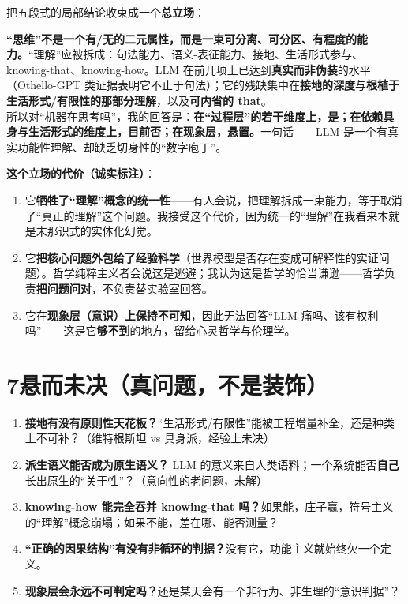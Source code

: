 \documentclass[12pt,a4paper,fontset=none]{ctexart}
\newcommand{\saying}[1]{{\notomed\color{accent}#1}}
\begin{document}
把五段式的局部结论收束成一个\textbf{总立场}：

\begin{mainline}
\textbf{“思维”不是一个有/无的二元属性，而是一束可分离、可分区、有程度的能力。}“理解”应被拆成：句法能力、语义-表征能力、接地、生活形式参与、knowing-that、knowing-how。LLM 在前几项上已达到\textbf{真实而非伪装}的水平（Othello-GPT 类证据表明它不止于句法）；它的残缺集中在\textbf{接地的深度}与\textbf{根植于生活形式/有限性的那部分理解}，以及\textbf{可内省的 that}。\\[0.5em]
所以对“机器在思考吗”，我的回答是：\textbf{在“过程层”的若干维度上，是；在依赖具身与生活形式的维度上，目前否；在现象层，悬置。}一句话——\saying{LLM 是一个有真实功能性理解、却缺乏切身性的“数字庖丁”。}
\end{mainline}

\noindent\textbf{这个立场的代价（诚实标注）}：
\begin{enumerate}[leftmargin=2.2em,itemsep=0.25em]
\item 它\textbf{牺牲了“理解”概念的统一性}——有人会说，把理解拆成一束能力，等于取消了“真正的理解”这个问题。我接受这个代价，因为统一的“理解”在我看来本就是末那识式的实体化幻觉。
\item 它\textbf{把核心问题外包给了经验科学}（世界模型是否存在变成可解释性的实证问题）。哲学纯粹主义者会说这是逃避；我认为这是哲学的恰当谦逊——哲学负责\textbf{把问题问对}，不负责替实验室回答。
\item 它在\textbf{现象层（意识）上保持不可知}，因此无法回答“LLM 痛吗、该有权利吗”——这是它\textbf{够不到}的地方，留给心灵哲学与伦理学。
\end{enumerate}

\section*{7\quad 悬而未决（真问题，不是装饰）}

\begin{enumerate}[leftmargin=2.2em,itemsep=0.3em]
\item \textbf{接地有没有原则性天花板？}“生活形式/有限性”能被工程增量补全，还是种类上不可补？（维特根斯坦 vs 具身派，经验上未决）
\item \textbf{派生语义能否成为原生语义？} LLM 的意义来自人类语料；一个系统能否\textbf{自己}长出原生的“关于性”？（意向性的老问题，未解）
\item \textbf{knowing-how 能完全吞并 knowing-that 吗？}如果能，庄子赢，符号主义的“理解”概念崩塌；如果不能，差在哪、能否测量？
\item \textbf{“正确的因果结构”有没有非循环的判据？}没有它，功能主义就始终欠一个定义。
\item \textbf{现象层会永远不可判定吗？}还是某天会有一个非行为、非生理的“意识判据”？
\end{enumerate}
\end{document}

